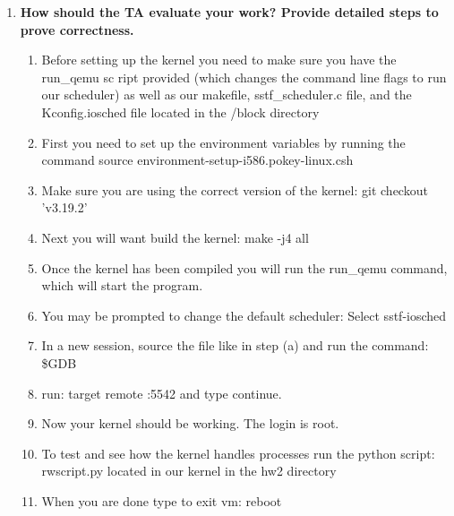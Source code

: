\documentclass[letterpaper,10pt,notitlepage,fleqn]{article}
\begin{document}
\begin{enumerate}
\item \textbf{How should the TA evaluate your work? Provide detailed steps to prove correctness.} 	\begin{enumerate}
	\item Before setting up the kernel you need to make sure you have the run\_qemu sc ript provided (which changes the command line flags to run our scheduler) as well as our makefile, sstf\_scheduler.c file, and the Kconfig.iosched file located in the /block directory
	\item First you need to set up the environment variables by running the command source environment-setup-i586.pokey-linux.csh
    
    \item Make sure you are using the correct version of the kernel: git checkout 'v3.19.2' 
    \item Next you will want build the kernel: make -j4 all
    \item Once the kernel has been compiled you will run the run\_qemu command, which will start the program.
    \item You may be prompted to change the default scheduler: Select sstf-iosched
    \item In a new session, source the file like in step (a) and run the command: \$GDB 
    \item run: target remote :5542 and type continue.
    \item Now your kernel should be working. The login is root. 
    \item To test and see how the kernel handles processes run the python script: rwscript.py located in our kernel in the hw2 directory 
    \item When you are done type to exit vm: reboot 
	\end{enumerate}
\end{enumerate}
\end{document}

